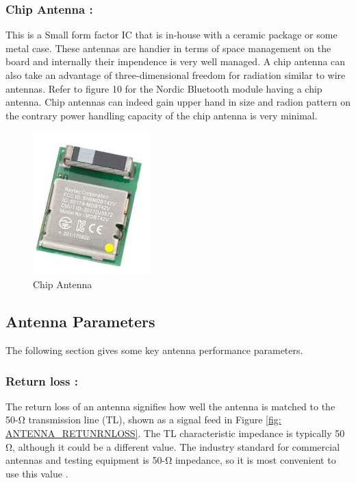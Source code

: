 \subsubsection{ Chip Antenna :} This is a Small form factor IC that is in-house with a ceramic package or some metal case.
These antennas are handier in terms of space management on the board and internally their impendence is very well managed.
A chip antenna can also take an advantage of three-dimensional freedom for radiation similar to wire antennas.
Refer to figure 10 for the Nordic Bluetooth module having a chip antenna.
Chip antennas can indeed gain upper hand in size and radion pattern on the contrary power handling capacity of the chip antenna is very minimal.
\begin{figure}[h]
	\centering
	\includegraphics[width=0.4\textwidth]{Chap03/Figures/Chip_Antenna.PNG}
	\caption{Chip Antenna}
	\label{CHIP_ANTENNA}
\end{figure}



\subsection{Antenna Parameters}

The following section gives some key antenna performance parameters.

\subsubsection{Return loss :}

The return loss of an antenna signifies how well the antenna is matched to the 50-Ω transmission line (TL), shown as a signal feed in Figure \ref{fig: ANTENNA_RETUNRNLOSS}. The TL characteristic impedance is typically 50 Ω, although it could be a different value. The industry standard for commercial antennas and testing equipment is 50-Ω impedance, so it is most convenient to use this value \cite{AN91445}. \\
	
